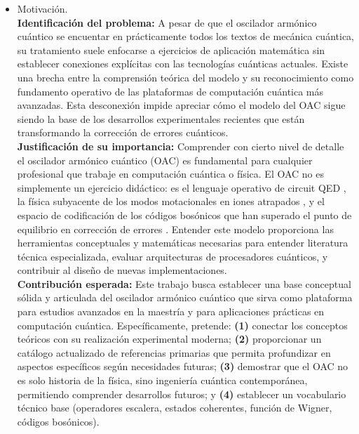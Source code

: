 \documentclass[11pt,a4paper,spanish]{book}
\begin{document}
\begin{itemize}
\item Motivación.\\
\textbf{Identificación del problema:} A pesar de que el oscilador armónico cuántico se encuentar en prácticamente todos los textos de mecánica cuántica, su tratamiento suele enfocarse a ejercicios de aplicación matemática sin establecer conexiones explícitas con las tecnologías cuánticas actuales. Existe una brecha entre la comprensión teórica del modelo y su reconocimiento como fundamento operativo de las plataformas de computación cuántica más avanzadas. Esta desconexión impide apreciar cómo el modelo del OAC sigue siendo la base de los desarrollos experimentales recientes que están transformando la corrección de errores cuánticos.\\

\textbf{Justificación de su importancia:} Comprender con cierto nivel de detalle el oscilador armónico cuántico (OAC) es fundamental para cualquier profesional que trabaje en computación cuántica o física. El OAC no es simplemente un ejercicio didáctico: es el lenguaje operativo de circuit QED \citep{blais2021}, la física subyacente de los modos motacionales en iones atrapados \citep{cirac1995, leibfried2003}, y el espacio de codificación de los códigos bosónicos que han superado el punto de equilibrio en corrección de errores \cite{sivak2023, ni2023, reglade2024}. Entender este modelo proporciona las herramientas conceptuales y matemáticas necesarias para entender literatura técnica especializada, evaluar arquitecturas de procesadores cuánticos, y contribuir al diseño de nuevas implementaciones.\\

\textbf{Contribución esperada:} Este trabajo busca establecer una base conceptual sólida y articulada del oscilador armónico cuántico que sirva como plataforma para estudios avanzados en la maestría y para aplicaciones prácticas en computación cuántica. Específicamente, pretende: \textbf{(1)} conectar los conceptos teóricos con su realización experimental moderna; \textbf{(2)} proporcionar un catálogo actualizado de referencias primarias que permita profundizar en aspectos específicos según necesidades futuras; \textbf{(3)} demostrar que el OAC no es solo historia de la física, sino ingeniería cuántica contemporánea, permitiendo comprender desarrollos futuros; y \textbf{(4)} establecer un vocabulario técnico base (operadores escalera, estados coherentes, función de Wigner, códigos bosónicos).\\


\end{itemize}
\end{document}
